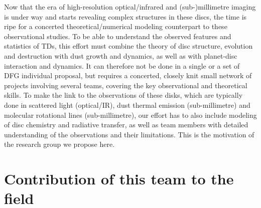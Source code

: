 \documentclass[10pt,fleqn,twoside]{article}
\begin{document}
  Now that the
  era of high-resolution optical/infrared and (sub-)millimetre imaging is
  under way and starts revealing complex structures in these discs, the time
  is ripe for a concerted theoretical/numerical modeling counterpart to
  these observational studies. To be able to understand the observed
  features and statistics of TDs, this effort must combine the
  theory of disc structure, evolution and destruction with dust growth and
  dynamics, as well as with planet-disc interaction and dynamics. It can
  therefore not be done in a single or a set of DFG individual proposal, but
  requires a concerted, closely knit small network of projects involving
  several teams, covering the key observational and theoretical
  skills. To make the link to the observations of these disks, 
  which are typically done in scattered light (optical/IR), dust thermal
  emission (sub-millimetre) and molecular rotational lines (sub-millimetre),
  our effort has to also include modeling of disc chemistry and radiative
  transfer, as well as team members with detailed understanding of the
  observations and their limitations. This is the motivation of the research
  group we propose here.


\section{Contribution of this team to the field }
%
\end{document}
